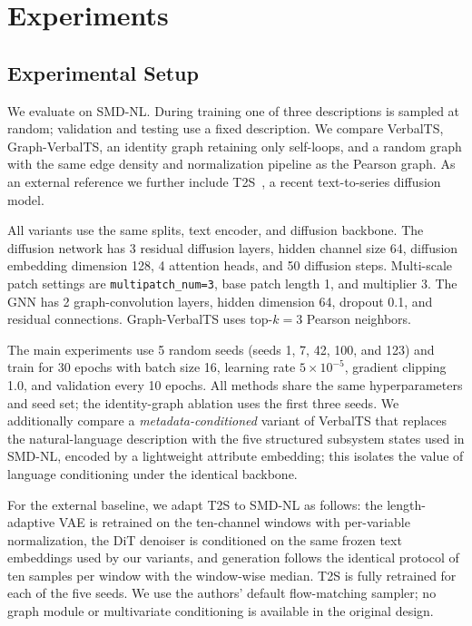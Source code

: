 \documentclass[conference]{IEEEtran}
\begin{document}
\section{Experiments}

\subsection{Experimental Setup}

We evaluate on SMD-NL. During training one of three descriptions is sampled at random; validation and testing use a fixed description. We compare VerbalTS, Graph-VerbalTS, an identity graph retaining only self-loops, and a random graph with the same edge density and normalization pipeline as the Pearson graph. As an external reference we further include T2S~\cite{ge2025t2s}, a recent text-to-series diffusion model.

All variants use the same splits, text encoder, and diffusion backbone. The diffusion network has 3 residual diffusion layers, hidden channel size 64, diffusion embedding dimension 128, 4 attention heads, and 50 diffusion steps. Multi-scale patch settings are \texttt{multipatch\_num=3}, base patch length 1, and multiplier 3. The GNN has 2 graph-convolution layers, hidden dimension 64, dropout 0.1, and residual connections. Graph-VerbalTS uses top-$k=3$ Pearson neighbors.

The main experiments use 5 random seeds (seeds 1, 7, 42, 100, and 123) and train for 30 epochs with batch size 16, learning rate $5\times10^{-5}$, gradient clipping 1.0, and validation every 10 epochs. All methods share the same hyperparameters and seed set; the identity-graph ablation uses the first three seeds. We additionally compare a \emph{metadata-conditioned} variant of VerbalTS that replaces the natural-language description with the five structured subsystem states used in SMD-NL, encoded by a lightweight attribute embedding; this isolates the value of language conditioning under the identical backbone.

For the external baseline, we adapt T2S to SMD-NL as follows: the length-adaptive VAE is retrained on the ten-channel windows with per-variable normalization, the DiT denoiser is conditioned on the same frozen text embeddings used by our variants, and generation follows the identical protocol of ten samples per window with the window-wise median. T2S is fully retrained for each of the five seeds. We use the authors' default flow-matching sampler; no graph module or multivariate conditioning is available in the original design.
\end{document}
